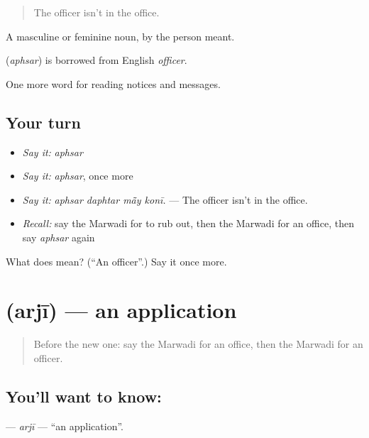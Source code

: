 \begin{quote}
The officer isn't in the office.
\end{quote}

A masculine or feminine noun, by the person meant.

\begin{cousinweb}
\textbf{} (\emph{aphsar}) is borrowed from English \emph{officer}.
\end{cousinweb}

\begin{grammarlens}[title={What you've built}]
One more word for reading notices and messages.
\end{grammarlens}

\subsection*{Your turn}
\begin{itemize}
\raggedright
  \item \emph{Say it:} \emph{aphsar}
  \item \emph{Say it:} \emph{aphsar}, once more
  \item \emph{Say it:} \emph{aphsar daphtar mā̃y konī.} — The officer isn't in the office.
  \item \emph{Recall:} say the Marwadi for to rub out, then the Marwadi for an office, then say \emph{aphsar} again
\end{itemize}

\begin{tcolorbox}[breakable,colback=teal!4,colframe=teal!35!black,title={Before you move on}]
What does  mean? (\textquotedblleft{}An officer\textquotedblright{}.) Say it once more.
\end{tcolorbox}
\section[\texorpdfstring{\mw{अरजी} (arjī)}{अरजी (arjī)}]{ (arjī) — an application}

\label{lesson:MW-C198-arji}



\begin{quote}
Before the new one: say the Marwadi for an office, then the Marwadi for an officer.
\end{quote}

\subsection*{You'll want to know: }
\textbf{} — \emph{arjī} — \textquotedblleft{}an application\textquotedblright{}.

